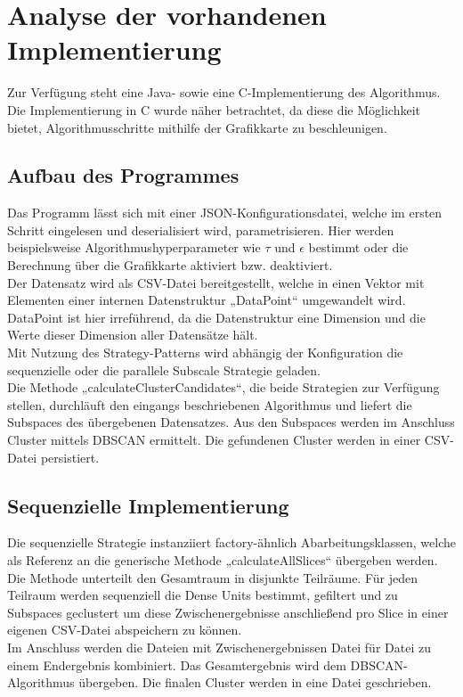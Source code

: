 \section{Analyse der vorhandenen Implementierung}
Zur Verfügung steht eine Java- sowie eine C-Implementierung des Algorithmus. Die Implementierung in C wurde näher betrachtet, da diese die Möglichkeit bietet, Algorithmusschritte mithilfe der Grafikkarte zu beschleunigen.

\subsection{Aufbau des Programmes}
Das Programm lässt sich mit einer JSON-Konfigurationsdatei, welche im ersten Schritt eingelesen und deserialisiert wird, parametrisieren. Hier werden beispielsweise Algorithmushyperparameter wie $\tau$ und $\epsilon$ bestimmt oder die Berechnung über die Grafikkarte aktiviert bzw. deaktiviert.\\
Der Datensatz wird als CSV-Datei bereitgestellt, welche in einen Vektor mit Elementen einer internen Datenstruktur „DataPoint“ umgewandelt wird. DataPoint ist hier irreführend, da die Datenstruktur eine Dimension und die Werte dieser Dimension aller Datensätze hält.\\
Mit Nutzung des Strategy-Patterns wird abhängig der Konfiguration die sequenzielle oder die parallele Subscale Strategie geladen.\\
Die Methode „calculateClusterCandidates“, die beide Strategien zur Verfügung stellen, durchläuft den eingangs beschriebenen Algorithmus und liefert die Subspaces des übergebenen Datensatzes. Aus den Subspaces werden im Anschluss Cluster mittels DBSCAN ermittelt. Die gefundenen Cluster werden in einer CSV-Datei persistiert.

\subsection{Sequenzielle Implementierung}
Die sequenzielle Strategie instanziiert factory-ähnlich Abarbeitungsklassen, welche als Referenz an die generische Methode „calculateAllSlices“ übergeben werden.\\
Die Methode unterteilt den Gesamtraum in disjunkte Teilräume. Für jeden Teilraum werden sequenziell die Dense Units bestimmt, gefiltert und zu Subspaces geclustert um diese Zwischenergebnisse anschließend pro Slice in einer eigenen CSV-Datei abspeichern zu können.\\
Im Anschluss werden die Dateien mit Zwischenergebnissen Datei für Datei zu einem Endergebnis kombiniert. Das Gesamtergebnis wird dem DBSCAN-Algorithmus übergeben. Die finalen Cluster werden in eine Datei geschrieben.

